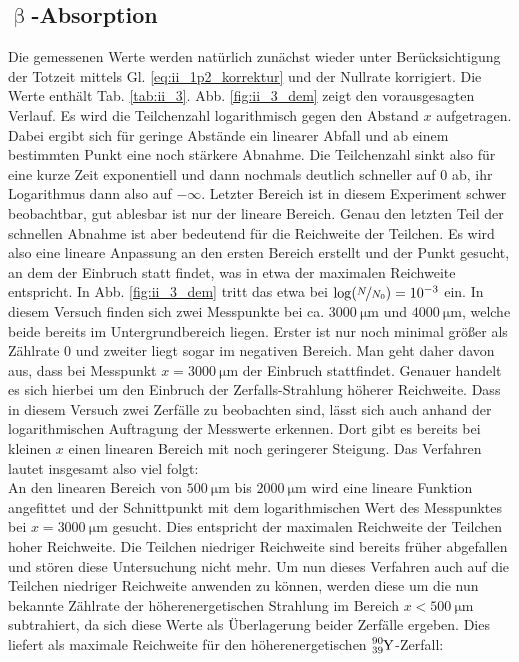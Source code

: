 \subsection{\texorpdfstring{$\upbeta$}{Beta}-Absorption}
Die gemessenen Werte werden natürlich zunächst wieder unter Berücksichtigung der Totzeit mittels Gl. \eqref{eq:ii_1p2_korrektur} und der Nullrate korrigiert. Die Werte enthält Tab. \ref{tab:ii_3}. Abb. \ref{fig:ii_3_dem} zeigt den vorausgesagten Verlauf. Es wird die Teilchenzahl logarithmisch gegen den Abstand $x$ aufgetragen. Dabei ergibt sich für geringe Abstände ein linearer Abfall und ab einem bestimmten Punkt eine noch stärkere Abnahme. Die Teilchenzahl sinkt also für eine kurze Zeit exponentiell und dann nochmals deutlich schneller auf 0 ab, ihr Logarithmus dann also auf $-\infty$. Letzter Bereich ist in diesem Experiment schwer beobachtbar, gut ablesbar ist nur der lineare Bereich. Genau den letzten Teil der schnellen Abnahme ist aber bedeutend für die Reichweite der Teilchen. Es wird also eine lineare Anpassung an den ersten Bereich erstellt und der Punkt gesucht, an dem der Einbruch statt findet, was in etwa der maximalen Reichweite entspricht. In Abb. \ref{fig:ii_3_dem} tritt das etwa bei $\log(\nicefrac{N}{N_0}) = 10^{-3}$ ein. In diesem Versuch finden sich zwei Messpunkte bei ca. $\SI{3000}{\micro\meter}$ und $\SI{4000}{\micro\meter}$, welche beide bereits im Untergrundbereich liegen. Erster ist nur noch minimal größer als Zählrate 0 und zweiter liegt sogar im negativen Bereich. Man geht daher davon aus, dass bei Messpunkt $x=\SI{3000}{\micro\meter}$ der Einbruch stattfindet. Genauer handelt es sich hierbei um den Einbruch der Zerfalls-Strahlung höherer Reichweite. Dass in diesem Versuch zwei Zerfälle zu beobachten sind, lässt sich auch anhand der logarithmischen Auftragung der Messwerte erkennen. Dort gibt es bereits bei kleinen $x$ einen linearen Bereich mit noch geringerer Steigung. Das Verfahren lautet insgesamt also viel folgt:\\
An den linearen Bereich von $\SI{500}{\micro\meter}$ bis $\SI{2000}{\micro\meter}$ wird eine lineare Funktion angefittet und der Schnittpunkt mit dem logarithmischen Wert des Messpunktes bei $x=\SI{3000}{\micro\meter}$ gesucht. Dies entspricht der maximalen Reichweite der Teilchen hoher Reichweite. Die Teilchen niedriger Reichweite sind bereits früher abgefallen und stören diese Untersuchung nicht mehr. Um nun dieses Verfahren auch auf die Teilchen niedriger Reichweite anwenden zu können, werden diese um die nun bekannte Zählrate der höherenergetischen Strahlung im Bereich $x < \SI{500}{\micro\meter}$ subtrahiert, da sich diese Werte als Überlagerung beider Zerfälle ergeben. Dies liefert als maximale Reichweite für den höherenergetischen $\ce{_{39}^{90} Y}$-Zerfall:
